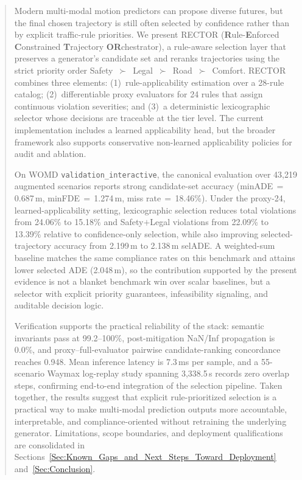 \documentclass[lettersize,journal, twocolumn]{IEEEtran}
\begin{document}
\begin{abstract}
Modern multi-modal motion predictors can propose diverse futures, but the final chosen trajectory is still often selected by confidence rather than by explicit traffic-rule priorities.  We present \textsc{RECTOR} (\textbf{R}ule-\textbf{E}nforced \textbf{C}onstrained \textbf{T}rajectory \textbf{OR}chestrator), a rule-aware selection layer that preserves a generator's candidate set and reranks trajectories using the strict priority order Safety~$\succ$~Legal~$\succ$~Road~$\succ$~Comfort.  \textsc{RECTOR} combines three elements: (1)~rule-applicability estimation over a 28-rule catalog; (2)~differentiable proxy evaluators for 24 rules that assign continuous violation severities; and (3)~a deterministic lexicographic selector whose decisions are traceable at the tier level.  The current implementation includes a learned applicability head, but the broader framework also supports conservative non-learned applicability policies for audit and ablation.

On WOMD \texttt{validation\_interactive}, the canonical evaluation over 43{,}219 augmented scenarios reports strong candidate-set accuracy (minADE\,$=$\,0.687\,m, minFDE\,$=$\,1.274\,m, miss rate\,$=$\,18.46\%).  Under the proxy-24, learned-applicability setting, lexicographic selection reduces total violations from 24.06\% to 15.18\% and Safety$+$Legal violations from 22.09\% to 13.39\% relative to confidence-only selection, while also improving selected-trajectory accuracy from 2.199\,m to 2.138\,m selADE.  A weighted-sum baseline matches the same compliance rates on this benchmark and attains lower selected ADE (2.048\,m), so the contribution supported by the present evidence is not a blanket benchmark win over scalar baselines, but a selector with explicit priority guarantees, infeasibility signaling, and auditable decision logic.

Verification supports the practical reliability of the stack: semantic invariants pass at 99.2--100\%, post-mitigation NaN/Inf propagation is 0.0\%, and proxy--full-evaluator pairwise candidate-ranking concordance reaches 0.948.  Mean inference latency is 7.3\,ms per sample, and a 55-scenario Waymax log-replay study spanning 3{,}338.5\,s records zero overlap steps, confirming end-to-end integration of the selection pipeline.  Taken together, the results suggest that explicit rule-prioritized selection is a practical way to make multi-modal prediction outputs more accountable, interpretable, and compliance-oriented without retraining the underlying generator.  Limitations, scope boundaries, and deployment qualifications are consolidated in Sections~\ref{Sec:Known_Gaps_and_Next_Steps_Toward_Deployment} and~\ref{Sec:Conclusion}.
\end{abstract}
\end{document}
